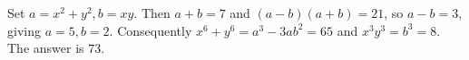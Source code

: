 Set $a=x^2+y^2,b=xy$. Then $a+b=7$ and $(a-b)(a+b)=21$, so $a-b=3$, giving $a=5,b=2$. Consequently $x^6+y^6=a^3-3ab^2=65$ and $x^3y^3=b^3=8$. The answer is $\boxed{73}$.
